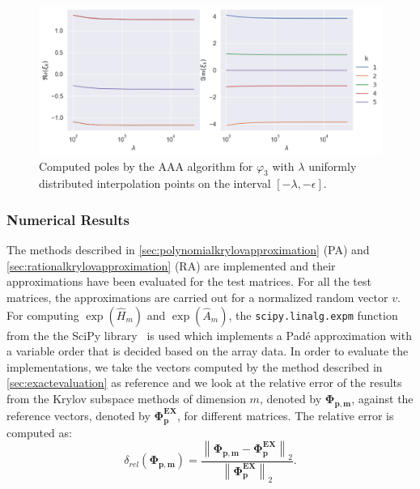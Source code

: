 \begin{figure}[h!]
    \centering
    \includegraphics[width=.9\textwidth]{img/AAA/poles_linspace_aaa.png}
    \caption{
        Computed poles by the AAA algorithm for $\varphi_3$ with $\lambda$ uniformly
        distributed interpolation points on the interval $[-\lambda, -\epsilon]$.
    }
    \label{fig:poles}
\end{figure}


\subsubsection*{Numerical Results}
The methods described in \autoref{sec:polynomialkrylovapproximation} (PA)
and \autoref{sec:rationalkrylovapproximation} (RA)
are implemented and their approximations have been evaluated for the test matrices.
For all the test matrices, the approximations are carried out for a normalized
random vector $v$.
For computing $\exp(\hat{H}_m)$ and $\exp(\hat{A}_m)$, the \texttt{scipy.linalg.expm}
function from the the SciPy library~\cite{SciPy2020} is used which implements a Padé
approximation with a variable order that is decided based on the array data.
In order to evaluate the implementations, we take the vectors computed by the method
described in \autoref{sec:exactevaluation} as reference and we look at the relative
error of the results from the Krylov subspace methods of dimension $m$, denoted by
$\mathbf{\Phi_{p, m}}$, against the reference vectors, denoted by $\mathbf{\Phi_p^{EX}}$,
for different matrices. The relative error is computed as:
\begin{equation*}
    \delta_{rel}(\mathbf{\Phi_{p, m}}) =
    \frac{\left\| \mathbf{\Phi_{p, m}} - \mathbf{\Phi_p^{EX}} \right\|_2}
    {\left\| \mathbf{\Phi_p^{EX}} \right\|_2}.
\end{equation*}

